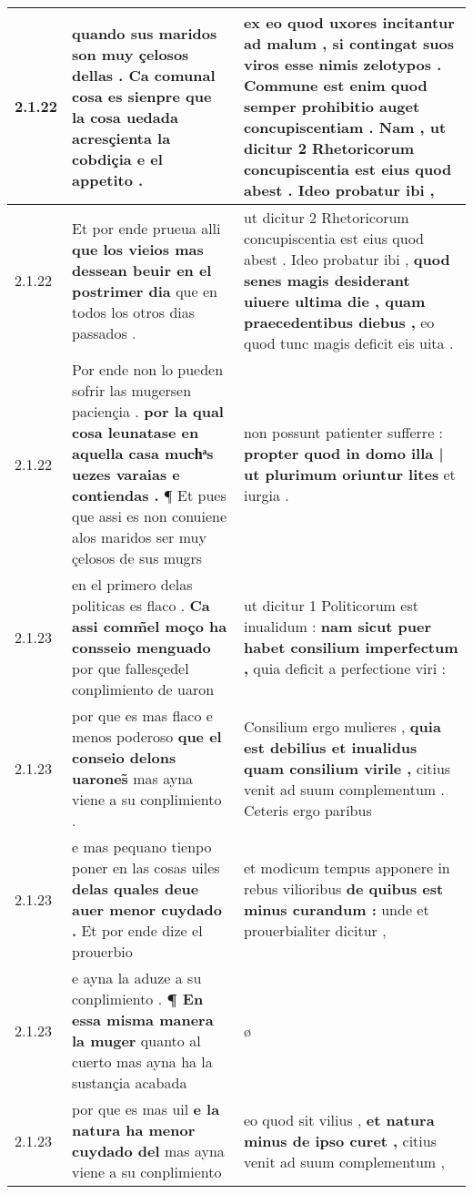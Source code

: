\begin{tabular}{|p{1cm}|p{6.5cm}|p{6.5cm}|}
2.1.22 & quando sus maridos son muy çelosos dellas . \textbf{ Ca comunal cosa es sienpre } que la cosa uedada acresçienta la cobdiçia e el appetito . & ex eo quod uxores incitantur ad malum , \textbf{ si contingat suos viros esse nimis zelotypos . Commune est enim quod semper prohibitio auget concupiscentiam . Nam , } ut dicitur 2 Rhetoricorum concupiscentia est eius quod abest . Ideo probatur ibi , \\\hline
2.1.22 & Et por ende prueua alli \textbf{ que los vieios mas dessean beuir en el postrimer dia } que en todos los otros dias passados . & ut dicitur 2 Rhetoricorum concupiscentia est eius quod abest . Ideo probatur ibi , \textbf{ quod senes magis desiderant uiuere ultima die , quam praecedentibus diebus , } eo quod tunc magis deficit eis uita . \\\hline
2.1.22 & Por ende non lo pueden sofrir las mugersen paciençia . \textbf{ por la qual cosa leunatase en aquella casa muchͣs uezes varaias e contiendas . } ¶ Et pues que assi es non conuiene alos maridos ser muy çelosos de sus mugrs & non possunt patienter sufferre : \textbf{ propter quod in domo illa | ut plurimum oriuntur lites } et iurgia . \\\hline
2.1.23 & en el primero delas politicas es flaco . \textbf{ Ca assi comm̃el moço ha consseio menguado } por que fallesçedel conplimiento de uaron & ut dicitur 1 Politicorum est inualidum : \textbf{ nam sicut puer habet consilium imperfectum , } quia deficit a perfectione viri : \\\hline
2.1.23 & por que es mas flaco e menos poderoso \textbf{ que el conseio delons uarones̃ } mas ayna viene a su conplimiento . & Consilium ergo mulieres , \textbf{ quia est debilius et inualidus quam consilium virile , } citius venit ad suum complementum . Ceteris ergo paribus \\\hline
2.1.23 & e mas pequano tienpo poner en las cosas uiles \textbf{ delas quales deue auer menor cuydado . } Et por ende dize el prouerbio & et modicum tempus apponere in rebus vilioribus \textbf{ de quibus est minus curandum : } unde et prouerbialiter dicitur , \\\hline
2.1.23 & e ayna la aduze a su conplimiento . \textbf{ ¶ En essa misma manera la muger } quanto al cuerto mas ayna ha la sustançia acabada & ø \\\hline
2.1.23 & por que es mas uil \textbf{ e la natura ha menor cuydado del } mas ayna viene a su conplimiento & eo quod sit vilius , \textbf{ et natura minus de ipso curet , } citius venit ad suum complementum , \\\hline

\end{tabular}
